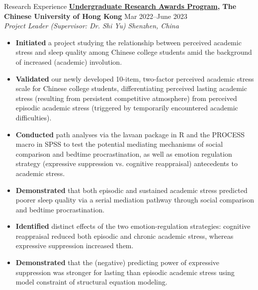 \documentclass{resume} %
\begin{document}
\begin{rSection}{Research Experience}
\textbf{\href{https://drive.google.com/file/d/1Rfo_FIJpXXdzmGF8aJqqhqCIW6UBfsGE/view?usp=sharing}{Undergraduate Research Awards Program}, The Chinese University of Hong Kong} \hfill{Mar 2022--June 2023} \\
\textit{Project Leader (Supervisor: Dr. Shi Yu)} \hfill{\textit{Shenzhen, China}}
 \begin{itemize}
    \itemsep -5pt {}  
     \item \textbf{Initiated} a project studying the relationship between perceived academic stress and sleep quality among Chinese college students amid the background of increased (academic) involution.
     \item \textbf{Validated} our newly developed 10-item, two-factor perceived academic stress scale for Chinese college students, differentiating perceived lasting academic stress (resulting from persistent competitive atmosphere) from perceived episodic academic stress (triggered by temporarily encountered academic difficulties).
     \item \textbf{Conducted} path analyses via the lavaan package in R and the PROCESS macro in SPSS to test the potential mediating mechanisms of social comparison and bedtime procrastination, as well as emotion regulation strategy (expressive suppression vs. cognitive reappraisal) antecedents to academic stress.
     \item \textbf{Demonstrated} that both episodic and sustained academic stress predicted poorer sleep quality via a serial mediation pathway through social comparison and bedtime procrastination. 
     \item \textbf{Identified} distinct effects of the two emotion-regulation strategies: cognitive reappraisal reduced both episodic and chronic academic stress, whereas expressive suppression increased them. 
     \item \textbf{Demonstrated} that the (negative) predicting power of expressive suppression was stronger for lasting than episodic academic stress using model constraint of structural equation modeling. 
 \end{itemize}


\end{rSection}
\end{document}

